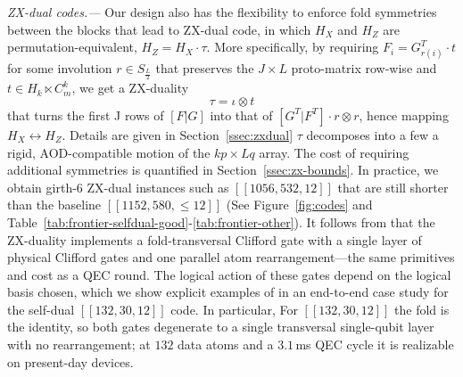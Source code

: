 \documentclass[amsmath,amssymb,twocolumn,aps,prl,superscriptaddress,nofootinbib]{revtex4-2}
\newcommand{\lead}[1]{\textit{#1.---}}
\theoremstyle{definition}
\begin{document}
\lead{ZX-dual codes} Our design also has the flexibility to enforce fold symmetries between the blocks that lead to ZX-dual code, in which $H_X$ and $H_Z$ are permutation-equivalent, $H_Z= H_X\cdot\tau$. More specifically, by requiring $F_i = G_{r(i)}^T\cdot t$ for some involution $r\in S_{\frac L2}$ that preserves the $J\times L$ proto-matrix row-wise and $t\in H_k\ltimes C^k_m$, we get a ZX-duality
\begin{equation}\label{eq:fold}
\tau = \iota\otimes t 
\end{equation}
that turns the first J rows of $[F|G]$ into that of $[G^{T}|F^{T}]\cdot r\otimes r$, hence mapping $H_X\leftrightarrow H_Z$. Details are given in Section~\ref{ssec:zxdual} $\tau$ decomposes into a few a rigid, AOD-compatible motion of the $kp\times Lq$ array. The cost of requiring additional symmetries is quantified in Section~\ref{ssec:zx-bounds}. In practice, we obtain girth-6 ZX-dual instances such as $[[1056,532,12]]$ that are still shorter than the baseline $[[1152,580,\le12]]$ (See Figure~\ref{fig:codes} and Table~\ref{tab:frontier-selfdual-good}-\ref{tab:frontier-other}). It follows from \cite{Breuckmann_2024} that the ZX-duality implements a fold-transversal Clifford gate with a single layer of physical Clifford gates and one parallel atom rearrangement---the same primitives and cost as a QEC round.  The logical action of these gates depend on the logical basis chosen, which we show explicit examples of in an end-to-end case study for the self-dual $[[132,30,12]]$ code. In particular,  For $[[132,30,12]]$ the fold is the identity, so both gates degenerate to a single transversal single-qubit layer with no rearrangement; at $132$ data atoms and a $3.1\,$ms QEC cycle it is realizable on present-day devices.
\end{document}
